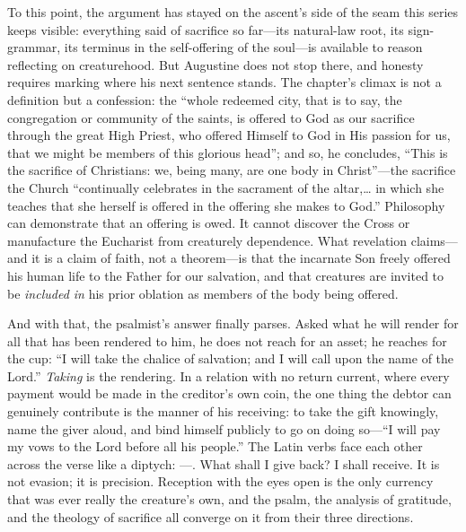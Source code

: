 To this point, the argument has stayed on the ascent's side of the seam this series keeps visible: everything said of sacrifice so far---its natural-law root, its sign-grammar, its terminus in the self-offering of the soul---is available to reason reflecting on creaturehood. But Augustine does not stop there, and honesty requires marking where his next sentence stands. The chapter's climax is not a definition but a confession: the ``whole redeemed city, that is to say, the congregation or community of the saints, is offered to God as our sacrifice through the great High Priest, who offered Himself to God in His passion for us, that we might be members of this glorious head''; and so, he concludes, ``This is the sacrifice of Christians: we, being many, are one body in Christ''---the sacrifice the Church ``continually celebrates in the sacrament of the altar,\ldots{} in which she teaches that she herself is offered in the offering she makes to God.'' Philosophy can demonstrate that an offering is owed. It cannot discover the Cross or manufacture the Eucharist from creaturely dependence. What revelation claims---and it is a claim of faith, not a theorem---is that the incarnate Son freely offered his human life to the Father for our salvation, and that creatures are invited to be \emph{included in} his prior oblation as members of the body being offered.

And with that, the psalmist's answer finally parses. Asked what he will render for all that has been rendered to him, he does not reach for an asset; he reaches for the cup: ``I will take the chalice of salvation; and I will call upon the name of the Lord.'' \emph{Taking} is the rendering. In a relation with no return current, where every payment would be made in the creditor's own coin, the one thing the debtor can genuinely contribute is the manner of his receiving: to take the gift knowingly, name the giver aloud, and bind himself publicly to go on doing so---``I will pay my vows to the Lord before all his people.'' The Latin verbs face each other across the verse like a diptych: ---. What shall I give back? I shall receive. It is not evasion; it is precision. Reception with the eyes open is the only currency that was ever really the creature's own, and the psalm, the analysis of gratitude, and the theology of sacrifice all converge on it from their three directions.
